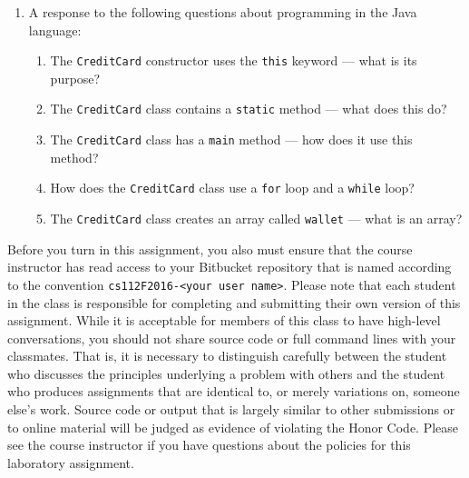 \begin{enumerate}
\begin{enumerate}
      \item A response to the following questions about programming in the Java language:

        \begin{enumerate}
          \itemsep 0em

          \item The {\tt CreditCard} constructor uses the {\tt this} keyword --- what is its purpose?

          \item The {\tt CreditCard} class contains a {\tt static} method --- what does this do?

          \item The {\tt CreditCard} class has a {\tt main} method --- how does it use this method?

          \item How does the {\tt CreditCard} class use a {\tt for} loop and a {\tt while} loop?

          \item The {\tt CreditCard} class creates an array called {\tt wallet} --- what is an array?

        \end{enumerate}

    \end{enumerate}

\end{enumerate}

\vspace*{-.05in}

Before you turn in this assignment, you also must ensure that the course instructor has read access to your Bitbucket
repository that is named according to the convention {\tt cs112F2016-<your user name>}. Please note that each student in
the class is responsible for completing and submitting their own version of this assignment. While it is acceptable for
members of this class to have high-level conversations, you should not share source code or full command lines with your
classmates.  That is, it is necessary to distinguish carefully between the student who discusses the principles
underlying a problem with others and the student who produces assignments that are identical to, or merely variations
on, someone else's work.  Source code or output that is largely similar to other submissions or to online material will
be judged as evidence of violating the Honor Code. Please see the course instructor if you have questions about the policies
for this laboratory assignment.


